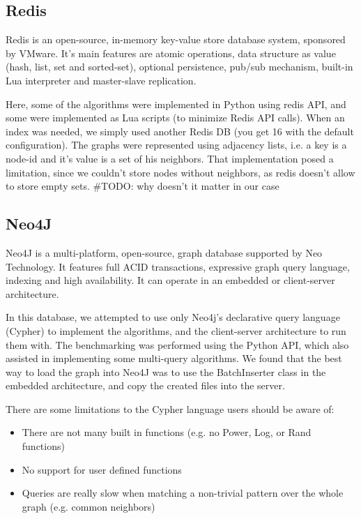 \subsection{Redis}
Redis is an open-source, in-memory key-value store database system, sponsored
by VMware. It's main features are atomic operations, data structure as value
(hash, list, set and sorted-set), optional persistence, pub/sub mechanism,
built-in Lua interpreter and master-slave replication. 

Here, some of the algorithms were implemented in Python using redis API, and
some were implemented as Lua scripts (to minimize Redis API calls). When an
index was needed, we simply used another Redis DB (you get 16 with the default
configuration). 
The graphs were represented using adjacency lists, i.e. a key is a node-id and
it's value is a set of his neighbors. That implementation posed a limitation,
since we couldn't store nodes without neighbors, as redis doesn't allow to
store empty sets. \#TODO: why doesn't it matter in our case 

\subsection{Neo4J}
Neo4J is a multi-platform, open-source, graph database supported by Neo
Technology. It features full ACID transactions, expressive graph query
language, indexing and high availability. It can operate in an embedded or
client-server architecture. 

In this database, we attempted to use only Neo4j's declarative query language
(Cypher) to implement the algorithms, and the client-server architecture to run
them with. The benchmarking was performed using the Python API, which also
assisted in implementing some multi-query algorithms. We found that the best
way to load the graph into Neo4J was to use the BatchInserter class in the
embedded architecture, and copy the created files into the server. 

There are some limitations to the Cypher language users should be aware of:
\begin{itemize}
\item There are not many built in functions (e.g. no Power, Log, or Rand
  functions) 
\item No support for user defined functions
\item Queries are really slow when matching a non-trivial pattern over the whole
graph (e.g. common neighbors)  
\end{itemize}

